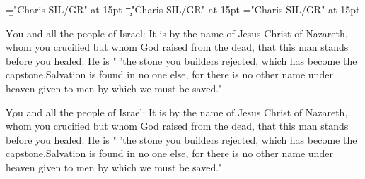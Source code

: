 \documentclass[a4paper]{article}
\begin{document}
\pagestyle{plain}
\sloppy
\setlength{\parfillskip}{0pt plus 1fil}
\font\b="Charis SIL/GR" at 15pt
\font\c="Charis SIL/GR" at 15pt
\font\a="Charis SIL/GR" at 15pt

\mbox{} 
\newpage 
\newpage 
\setcounter{page}{1} 
\pagestyle{fancy} 

\b{You and all the people of Israel: It is by the name of Jesus Christ of Nazareth, whom you crucified but whom God raised from the dead, that this man stands before you healed. He is " 'the stone you builders rejected, which has become the capstone.Salvation is found in no one else, for there is no other name under heaven given to men by which we must be saved." }

\c{You and all the people of Israel: It is by the name of Jesus Christ of Nazareth, whom you crucified but whom God raised from the dead, that this man stands before you healed. He is " 'the stone you builders rejected, which has become the capstone.Salvation is found in no one else, for there is no other name under heaven given to men by which we must be saved." }

\end{document}
